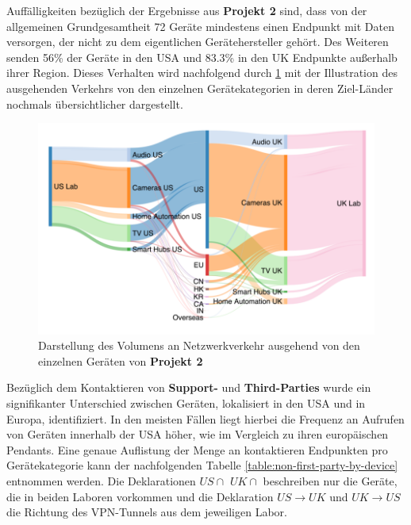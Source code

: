 \noindent Auffälligkeiten bezüglich der Ergebnisse aus \textbf{Projekt 2} sind, dass von der allgemeinen Grundgesamtheit 72 Geräte mindestens einen Endpunkt mit Daten versorgen, der nicht zu dem eigentlichen Gerätehersteller gehört. 
Des Weiteren senden 56\% der Geräte in den USA und 83.3\% in den UK Endpunkte außerhalb ihrer Region. Dieses Verhalten wird nachfolgend durch \ref{fig:traffic-flow} mit der Illustration des ausgehenden Verkehrs von den einzelnen Gerätekategorien in deren Ziel-Länder nochmals übersichtlicher dargestellt. 

\begin{figure}
    \centering
    \includegraphics[scale=0.3]{main/pictures/projekt_two/Traffic_Flow_Destinations}
    \caption{Darstellung des Volumens an Netzwerkverkehr ausgehend von den einzelnen Geräten von \textbf{Projekt 2} \cite{Ren2019}}
    \label{fig:traffic-flow}
\end{figure}

\noindent Bezüglich dem Kontaktieren von \textbf{Support-} und \textbf{Third-Parties} wurde ein signifikanter Unterschied zwischen Geräten, lokalisiert in den USA und in Europa, identifiziert. 
In den meisten Fällen liegt hierbei die Frequenz an Aufrufen von Geräten innerhalb der USA höher, wie im Vergleich zu ihren europäischen Pendants. Eine genaue Auflistung der Menge an kontaktieren Endpunkten pro Gerätekategorie kann der nachfolgenden Tabelle \ref{table:non-first-party-by-device} entnommen werden. 
Die Deklarationen $US\cap$ $UK\cap$ beschreiben nur die Geräte, die in beiden Laboren vorkommen und die Deklaration $US \rightarrow UK$ und $UK \rightarrow US$ die Richtung des VPN-Tunnels aus dem jeweiligen Labor. 

